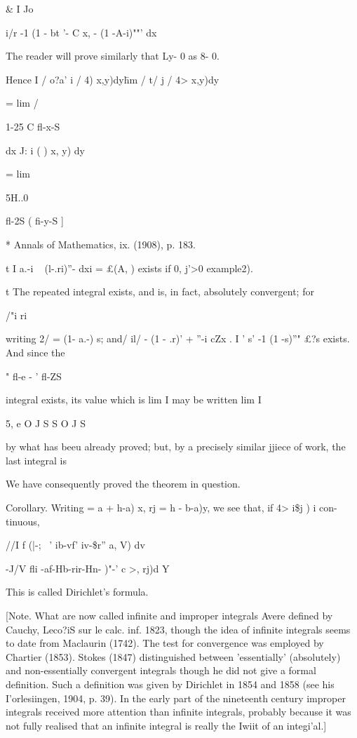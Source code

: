   \& I Jo

 i/r -1 (1 - bt '- C x, - (1 -A-i)""' dx

The reader will prove similarly that Ly- 0 as 8- 0.

Hence I / o?a' i / 4) x,y)dy\= hm / t/ j / 4> x,y)dy\

= lim /

1-25 C fl-x-S

dx J: i ( ) x, y) dy

= lim

5H..0

fl-2S ( fi-y-S ]

* Annals of Mathematics, ix. (1908), p. 183.

t I a.-i ~ (l-.ri)''- dxi = £(A, ) exists if 0, j'>0 example2).

t The repeated integral exists, and is, in fact, absolutely
convergent; for

/"i ri

writing 2/ = (1- a.-) s; and/ il/ - (1 - .r)' + ''-i cZx . I ' s' -1
(1 -s)''" £?s exists. And since the

 " fl-e - ' fl-ZS

integral exists, its value which is lim I may be written lim I

5, e O J S S O J S

%
%

by what has beeu already proved; but, by a precisely similar jjiece
of work, the last integral is

We have consequently proved the theorem in question.

Corollary. Writing = a + h-a) x, rj = h - b-a)y, we see that, if 4>
i\$j ) i con- tinuous,

//I f (|-; ~' ib-vf' iv-\$r'' a, V) dv

-J/V fli -af-Hb-rir-Hn- )"-' c >, rj)d Y

This is called Dirichlet's formula.

[Note. What are now called infinite and improper integrals Avere
defined by Cauchy, Leco?iS sur le calc. inf. 1823, though the idea of
infinite integrals seems to date from Maclaurin (1742). The test for
convergence was employed by Chartier (1853). Stokes (1847)
distinguished between 'essentially' (absolutely) and non-essentially
convergent integrals though he did not give a formal definition. Such
a definition was given by Dirichlet in 1854 and 1858 (see his
I'orlesiingen, 1904, p. 39). In the early part of the nineteenth
century improper integrals received more attention than infinite
integrals, probably because it was not fully realised that an infinite
integral is really the Iwiit of an integi'al.]


